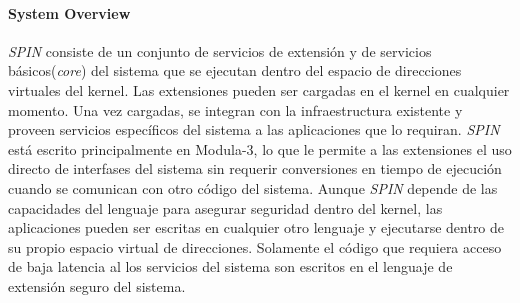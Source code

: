 \paragraph{\textnormal{\textbf{System Overview}}}
\textit{SPIN} consiste de un conjunto de servicios de extensión y de servicios básicos(\textit{core}) del sistema que se ejecutan dentro del espacio de direcciones virtuales del kernel. Las extensiones pueden ser cargadas en el kernel en cualquier momento. Una vez cargadas, se integran con la infraestructura existente y proveen servicios específicos del sistema a las aplicaciones que lo requiran. \textit{SPIN} está escrito principalmente en Modula-3, lo que le permite a las extensiones el uso directo de interfases del sistema sin requerir conversiones en tiempo de ejecución cuando se comunican con otro código del sistema. Aunque \textit{SPIN} depende de las capacidades del lenguaje para asegurar seguridad dentro del kernel, las aplicaciones pueden ser escritas en cualquier otro lenguaje y ejecutarse dentro de su propio espacio virtual de direcciones. Solamente el código que requiera acceso de baja latencia al los servicios del sistema son escritos en el lenguaje de extensión seguro del sistema.
 
